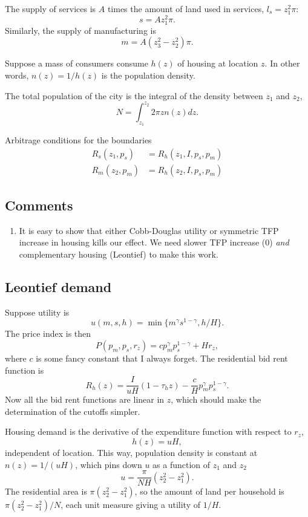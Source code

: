 \documentclass{amsart}
\theoremstyle{definition}
\theoremstyle{remark}
\numberwithin{equation}{section}
\begin{document}
The supply of services is $A$ times the amount of land used in services, $l_s = z_1^2\pi$:
\[
s = Az_1^2\pi.
\]
Similarly, the supply of manufacturing is
\[
m = A(z_3^2-z_2^2)\pi.
\]

Suppose a mass of consumers consume $h(z)$ of housing at location $z$. In other words, $n(z) = 1/h(z)$ is the population density. 

The total population of the city is the integral of the density between $z_1$ and $z_2$,
\[
N = \int_{z_1}^{z_2}2\pi z n(z) dz.
\]

Arbitrage conditions for the boundaries
\begin{align}
R_s(z_1,p_s) &= R_h(z_1,I,p_s,p_m)\\
R_m(z_2,p_m) &= R_h(z_2,I,p_s,p_m)
\end{align}
\subsection{Comments}
\begin{enumerate}
  \item It is easy to show that either Cobb-Douglas utility or symmetric TFP increase in housing kills our effect. We need slower TFP increase (0) \emph{and} complementary housing (Leontief) to make this work.
\end{enumerate}
\subsection{Leontief demand}
Suppose utility is
\[
u(m,s,h) = \min\{m^\gamma s^{1-\gamma}, h/H\}.
\]
The price index is then
\[
P(p_m,p_s,r_z) = c p_m^\gamma p_s^{1-\gamma} + H r_z,
\]
where $c$ is some fancy constant that I always forget. The residential bid rent function is 
\[
R_h(z) = \frac{I}{uH}(1-\tau_h z) -\frac cH p_m^\gamma p_s^{1-\gamma}.
\]
Now all the bid rent functions are linear in $z$, which should make the determination of the cutoffs simpler.

Housing demand is the derivative of the expenditure function with respect to $r_z$,
\[
h(z) = u H,
\]
independent of location. This way, population density is constant at $n(z) = 1/(uH)$, which pins down $u$ as a function of $z_1$ and $z_2$
\[
u = \frac{\pi}{N H}(z_2^2-z_1^2).
\]
The residential area is $\pi(z_2^2-z_1^2)$, so the amount of land per household is $\pi(z_2^2-z_1^2)/N$, each unit measure giving a utility of $1/H$.
\end{document}
